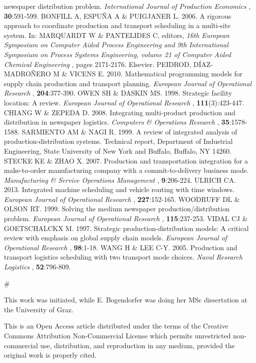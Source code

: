 \begin{biblio}[REFERENCES]
 newspaper distribution problem. \textit{International Journal of Production
 Economics} , \textbf{30}:591-599.
 BONFILL A, ESPUÑA A \& PUIGJANER L. 2006. A rigorous
 approach to coordinate production and transport scheduling in a multi-site system.
 In: MARQUARDT W \& PANTELIDES C, editors, \textit{16th European Symposium on
 Computer Aided Process Engineering and 9th International Symposium on Process
 Systems Engineering, volume 21 of Computer Aided Chemical Engineering} ,
 pages 2171-2176. Elsevier.
 PEIDROD, DÍAZ-MADROÑERO M \& VICENS E. 2010.
 Mathematical programming models for supply chain production and transport planning.
 \textit{European Journal of Operational Research} ,
 \textbf{204}:377-390.
\tit{ }OWEN SH \& DASKIN MS. 1998. Strategic facility location: A
 review. \textit{European Journal of Operational Research} ,
 \textbf{111}(3):423-447.
 CHIANG W \& ZEPEDA D. 2008. Integrating multi-product
 production and distribution in newspaper logistics. \textit{Computers \&
 Operations Research} , \textbf{35}:1578-1588.
\tit{ }SARMIENTO AM \& NAGI R. 1999. A review of integrated analysis of
 production-distribution systems. Technical report, Department of Industrial
 Engineering, State University of New York and Buffalo, Buffalo, NY
 14260.
\tit{ }STECKE KE \& ZHAO X. 2007. Production and transportation
 integration for a make-to-order manufacturing company with a commit-to-delivery
 business mode. \textit{Manufacturing \& Service Operations Management} ,
 \textbf{9}:206-224.
\tit{ }ULRICH CA. 2013. Integrated machine scheduling and vehicle routing
 with time windows. \textit{European Journal of Operational Research} ,
 \textbf{227}:152-165.
 WOODRUFF DL \& OLSON RT. 1999. Solving the medium
 newspaper production/distribution problem. \textit{European Journal of Operational
 Research} , \textbf{115}:237-253.
\tit{ }VIDAL CJ \& GOETSCHALCKX M. 1997. Strategic
 production-distribution models: A critical review with emphasis on global supply
 chain models. \textit{European Journal of Operational Research} ,
 \textbf{98}:1-18.
\tit{ }WANG H \& LEE C-Y. 2005. Production and transport logistics
 scheduling with two transport mode choices. \textit{Naval Research
 Logistics} , \textbf{52}:796-809.
\end{biblio}

\medskip\par\noindent
\footnotesize{\#\par This work was initiated, while E. Bogendorfer was doing her MSc dissertation at the
 University of Graz.
}

\medskip\par\noindent
\footnotesize{This is an Open Access article distributed under the terms of the Creative
 Commons Attribution Non-Commercial License which permits unrestricted
 non-commercial use, distribution, and reproduction in any medium, provided the
 original work is properly cited. }

